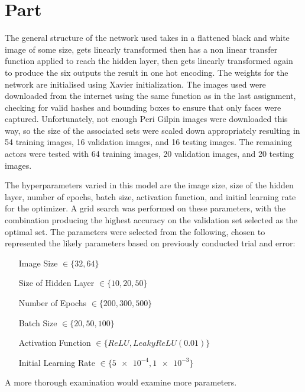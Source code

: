 \documentclass{article}
\newcommand{\enterproblemHeader}[1]{
}
\newcommand{\exitproblemHeader}[1]{
}
\newcounter{problem} %
\newcommand{\problemName}{}
\newenvironment{problem}[1][Part \theproblem]{ %
	\stepcounter{problem} %
	\renewcommand{\problemName}{#1} %
	\section{\problemName} %
	\enterproblemHeader{\problemName} %
}{
	\exitproblemHeader{\problemName} %
}
\begin{document}
\FloatBarrier
\begin{problem}
	The general structure of the network used takes in a flattened black and white image of some size, gets linearly transformed then has a non linear transfer function applied to reach the hidden layer, then gets linearly transformed again to produce the six outputs the result in one hot encoding. The weights for the network are initialised using Xavier initialization. The images used were downloaded from the internet using the same function as in the last assignment, checking for valid hashes and bounding boxes to ensure that only faces were captured. Unfortunately, not enough Peri Gilpin images were downloaded this way, so the size of the associated sets were scaled down appropriately resulting in 54 training images, 16 validation images, and 16 testing images. The remaining actors were tested with 64 training images, 20 validation images, and 20 testing images.
	
	The hyperparameters varied in this model are the image size, size of the hidden layer, number of epochs, batch size, activation function, and initial learning rate for the optimizer. A grid search was performed on these parameters, with the combination producing the highest accuracy on the validation set selected as the optimal set. The parameters were selected from the following, chosen to represented the likely parameters based on previously conducted trial and error:
	\begin{itemize}[leftmargin=10em]
		\item[Image Size] \(\in \{32, 64\}\)
		\item[Size of Hidden Layer] \(\in \{10, 20, 50\}\)
		\item[Number of Epochs] \(\in \{200, 300, 500\}\)
		\item[Batch Size] \(\in \{20, 50, 100\}\)
		\item[Activation Function] \(\in \{ReLU, LeakyReLU(0.01)\}\)
		\item[Initial Learning Rate] \(\in \{\num{5e-4}, \num{1e-3}\}\)
	\end{itemize}
	A more thorough examination would examine more parameters.
	

\end{problem}
\end{document}

